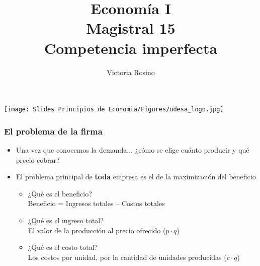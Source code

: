 \documentclass{beamer}
\title[Economía I]{Economía I \vspace{3mm}
\\ Magistral 15 \vspace{3mm} \\ Competencia imperfecta}
\date{}
\author[Victoria Rosino]{Victoria Rosino}
\institute[]{Universidad de San Andrés}
\begin{document}
\begin{frame}
\vspace{0.3cm}
\titlepage
\centering
\vspace{-0.9cm}
\texttt{[image: Slides Principios de Economia/Figures/udesa\_logo.jpg]} 
\end{frame}

\begin{frame}
\frametitle{El problema de la firma}
\begin{itemize}
    \item Una vez que conocemos la demanda... ¿cómo se elige cuánto producir y qué precio cobrar?
    \vspace{1mm}
    \item El problema principal de \textbf{toda} empresa es el de la maximización del beneficio
    \vspace{1mm}     
    \begin{itemize}
        \item ¿Qué es el beneficio? \vspace{1mm} \\ 
        Beneficio = Ingresos totales – Costos totales
        \vspace{1mm}
        \item ¿Qué es el ingreso total? 
        \vspace{1mm} \\ 
        El valor de la producción al precio ofrecido ($p\cdot q$)
        \vspace{1mm}
        \item ¿Qué es el costo total?
        \vspace{1mm} \\ 
        Los costos por unidad, por la cantidad de unidades producidas ($c\cdot q$)
    \end{itemize} 
\end{itemize} 
\end{frame}
\end{document}
